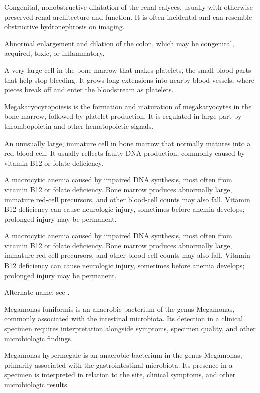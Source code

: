  Congenital, nonobstructive dilatation of the renal calyces, usually with otherwise preserved renal architecture and function. It is often incidental and can resemble obstructive hydronephrosis on imaging.

 Abnormal enlargement and dilation of the colon, which may be congenital, acquired, toxic, or inflammatory.

 A very large cell in the bone marrow that makes platelets, the small blood parts that help stop bleeding. It grows long extensions into nearby blood vessels, where pieces break off and enter the bloodstream as platelets.

 Megakaryocytopoiesis is the formation and maturation of megakaryocytes in the bone marrow, followed by platelet production. It is regulated in large part by thrombopoietin and other hematopoietic signals.

 An unusually large, immature cell in bone marrow that normally matures into a red blood cell. It usually reflects faulty DNA production, commonly caused by vitamin B12 or folate deficiency.

 A macrocytic anemia caused by impaired DNA synthesis, most often from
vitamin B12 or folate deficiency. Bone marrow produces abnormally large, immature red-cell precursors,
and other blood-cell counts may also fall. Vitamin B12 deficiency can cause neurologic injury, sometimes
before anemia develops; prolonged injury may be permanent.

 A macrocytic anemia caused by impaired DNA synthesis, most often from
vitamin B12 or folate deficiency. Bone marrow produces abnormally large, immature red-cell precursors,
and other blood-cell counts may also fall. Vitamin B12 deficiency can cause neurologic injury, sometimes
before anemia develops; prolonged injury may be permanent.

 Alternate name; see .

 Megamonas funiformis is an anaerobic bacterium of the genus Megamonas, commonly associated with the intestinal microbiota. Its detection in a clinical specimen requires interpretation alongside symptoms, specimen quality, and other microbiologic findings.

 Megamonas hypermegale is an anaerobic bacterium in the genus Megamonas, primarily associated with the gastrointestinal microbiota. Its presence in a specimen is interpreted in relation to the site, clinical symptoms, and other microbiologic results.

